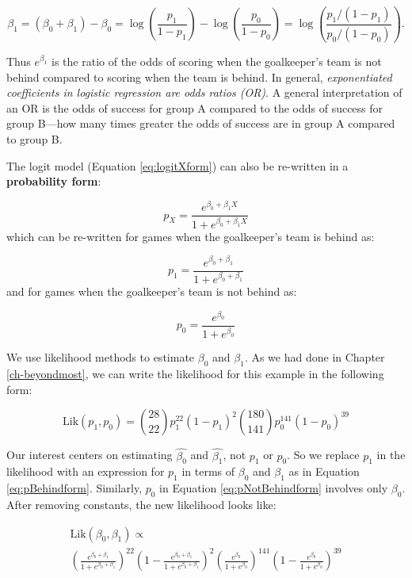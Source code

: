 \documentclass[
]{krantz}
\newcommand{\Lik}{\mathrm{Lik}}
\begin{document}
\begin{equation*}
\beta_1 = (\beta_0 + \beta_1) - \beta_0 = 
\log\left(\frac{p_1}{1-p_1}\right) - \log\left(\frac{p_0}{1-p_0}\right) =
\log\left(\frac{p_1/(1-p_1)}{p_0/{(1-p_0)}}\right).
\end{equation*}

Thus \(e^{\beta_1}\) is the ratio of the odds of scoring when the goalkeeper's team is not behind compared to scoring when the team is behind. In general, \emph{exponentiated coefficients in logistic regression are odds ratios (OR)}. A general interpretation of an OR is the odds of success for group A compared to the odds of success for group B---how many times greater the odds of success are in group A compared to group B.

The logit model (Equation \eqref{eq:logitXform}) can also be re-written in a \textbf{probability form}:

\begin{equation*} 
p_X=\frac{e^{\beta_0+\beta_1X}}{1+e^{\beta_0+\beta_1X}}
\end{equation*}
which can be re-written for games when the goalkeeper's team is behind as:

\begin{equation} 
p_1=\frac{e^{\beta_0+\beta_1}}{1+e^{\beta_0+\beta_1}}  
\label{eq:pBehindform}
\end{equation}
and for games when the goalkeeper's team is not behind as:

\begin{equation} 
p_0=\frac{e^{\beta_0}}{1+e^{\beta_0}}
\label{eq:pNotBehindform}
\end{equation}

We use likelihood methods to estimate \(\beta_0\) and \(\beta_1\). As we had done in Chapter \ref{ch-beyondmost}, we can write the likelihood for this example in the following form:

\[\Lik(p_1, p_0) = {28 \choose 22}p_1^{22}(1-p_1)^{2}
{180 \choose 141}p_0^{141}(1-p_0)^{39}\]

Our interest centers on estimating \(\hat{\beta_0}\) and \(\hat{\beta_1}\), not \(p_1\) or \(p_0\). So we replace \(p_1\) in the likelihood with an expression for \(p_1\) in terms of \(\beta_0\) and \(\beta_1\) as in Equation \eqref{eq:pBehindform}. Similarly, \(p_0\) in Equation \eqref{eq:pNotBehindform} involves only \(\beta_0\). After removing constants, the new likelihood looks like:

\begin{equation*}
\begin{gathered}
    \Lik(\beta_0,\beta_1) \propto \\
    \left( \frac{e^{\beta_0+\beta_1}}{1+e^{\beta_0+\beta_1}}\right)^{22}\left(1- \frac{e^{\beta_0+\beta_1}}{1+e^{\beta_0+\beta_1}}\right)^{2}
    \left(\frac{e^{\beta_0}}{1+e^{\beta_0}}\right)^{141}\left(1-\frac{e^{\beta_0}}{1+e^{\beta_0}}\right)^{39}
\end{gathered}
\end{equation*}
\end{document}
